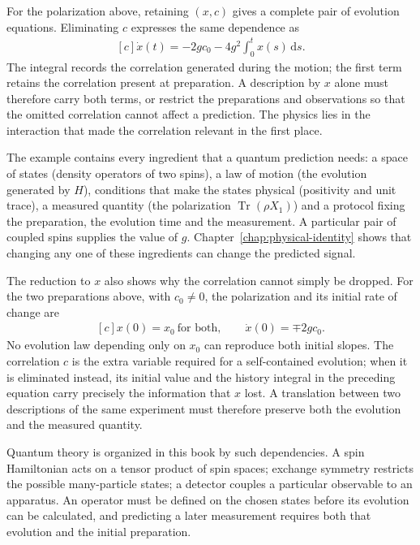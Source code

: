 \documentclass[11pt,oneside]{book}
\newenvironment{centeredalign}{\[\begin{gathered}[c]}{\end{gathered}\]}
\begin{document}
For the polarization above, retaining \((x,c)\) gives a complete pair of
evolution equations. Eliminating \(c\) expresses the same dependence as
\begin{centeredalign}
\dot x(t)=-2gc_0-4g^2\int_0^t x(s)\,\mathrm ds.
\end{centeredalign}
The integral records the correlation generated during the motion; the first
term retains the correlation present at preparation. A description by \(x\)
alone must therefore carry both terms, or restrict the preparations and
observations so that the omitted correlation cannot affect a prediction. The
physics lies in the interaction that made the correlation relevant in the
first place.

The example contains every ingredient that a quantum prediction needs: a
space of states (density operators of two spins), a law of motion (the
evolution generated by \(H\)), conditions that make the states physical
(positivity and unit trace), a measured quantity (the polarization
\(\operatorname{Tr}(\rho X_1)\)) and a protocol fixing the preparation, the
evolution time and the measurement. A particular pair of coupled spins
supplies the value of \(g\). Chapter~\ref{chap:physical-identity} shows that
changing any one of these ingredients can change the predicted signal.

The reduction to \(x\) also shows why the correlation cannot simply be
dropped. For the two preparations above, with \(c_0\ne0\), the polarization
and its initial rate of change are
\begin{centeredalign}
x(0)=x_0\ \text{for both},\qquad \dot x(0)=\mp 2gc_0 .
\end{centeredalign}
No evolution law depending only on \(x_0\) can reproduce both initial slopes.
The correlation \(c\) is the extra variable required for a self-contained
evolution; when it is eliminated instead, its initial value and the history
integral in the preceding equation carry precisely the information that \(x\)
lost. A translation between two descriptions of the same experiment must
therefore preserve both the evolution and the measured quantity.

Quantum theory is organized in this book by such dependencies. A spin
Hamiltonian acts on a tensor product of spin spaces; exchange symmetry
restricts the possible many-particle states; a detector couples a particular
observable to an apparatus. An operator must be defined on the chosen states
before its evolution can be calculated, and predicting a later measurement
requires both that evolution and the initial preparation.
\end{document}

